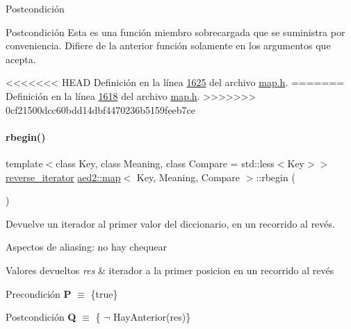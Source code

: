 \begin{DoxyPostcond}{\-Postcondición}
\begin{DoxyPostcond}{\-Postcondición}
Esta es una función miembro sobrecargada que se suministra por conveniencia. Difiere de la anterior función solamente en los argumentos que acepta. 

<<<<<<< HEAD
\-Definición en la línea \hyperlink{map_8h_source_l01625}{1625} del archivo \hyperlink{map_8h_source}{map.\-h}.
=======
Definición en la línea \hyperlink{map_8h_source_l01618}{1618} del archivo \hyperlink{map_8h_source}{map.\+h}.
>>>>>>> 0cf21500dcc60bdd14dbf4470236b5159feeb7ce

\mbox{\label{classaed2_1_1map_ac412d3902112122c1bffe2d4283a4e9d_ac412d3902112122c1bffe2d4283a4e9d}} 
\paragraph{\texorpdfstring{rbegin()}{rbegin()}\hspace{0.1cm}{\footnotesize\ttfamily [1/2]}}
{\footnotesize\ttfamily template$<$class Key, class Meaning, class Compare = std\+::less$<$\+Key$>$$>$ \\
\hyperlink{classaed2_1_1map_a8e6a592062260177fd73b2f9897b1dd5_a8e6a592062260177fd73b2f9897b1dd5}{reverse\+\_\+iterator} \hyperlink{classaed2_1_1map}{aed2\+::map}$<$ Key, Meaning, Compare $>$\+::rbegin (\begin{DoxyParamCaption}{ }\end{DoxyParamCaption})\hspace{0.3cm}{\ttfamily [inline]}}



Devuelve un iterador al primer valor del diccionario, en un recorrido al revés. 

\begin{DoxyParagraph}{Aspectos de aliasing\+:}
no hay chequear
\end{DoxyParagraph}

\begin{DoxyRetVals}{Valores devueltos}
{\em res} & iterador a la primer posicion en un recorrido al revés\\
\hline
\end{DoxyRetVals}
\begin{DoxyPrecond}{Precondición}
{\bfseries P} $\equiv$ \{true\} 
\end{DoxyPrecond}
\begin{DoxyPostcond}{Postcondición}
{\bfseries Q} $\equiv$ \{ $\lnot$ Hay\+Anterior(res)\}
\end{DoxyPostcond}


\end{DoxyPostcond}
\end{DoxyPostcond}
